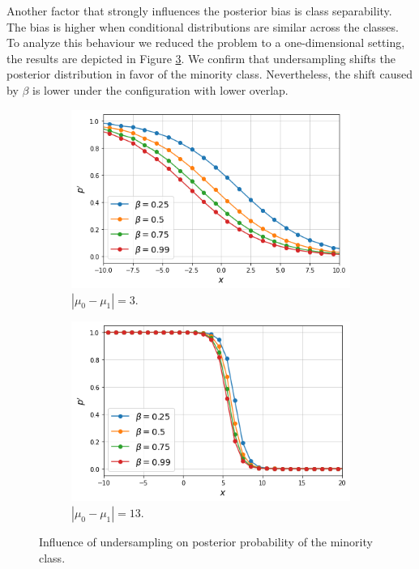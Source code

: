 \documentclass[conference]{IEEEtran}
\begin{document}
		Another factor that strongly influences the posterior bias is class separability. The bias is higher when conditional distributions are similar across the classes\cite{undersampling_posterior}. To analyze this behaviour we reduced the problem to a one-dimensional setting, the results are depicted in Figure \ref{fig:Undersampling_posterior}. We confirm that undersampling shifts the posterior distribution in favor of the minority class. Nevertheless, the shift caused by $\beta$ is lower under the configuration with lower overlap.
			\begin{figure}
			     \centering
			     \begin{subfigure}[b]{0.24\textwidth}
			         \centering
			         \includegraphics[width=\textwidth]{Undersampling_PosteriorBias}
			         \caption{$|\mu_0 - \mu_1|=3$.}
			         \label{fig:Undersampling_PosteriorBias}
			     \end{subfigure}
			     \hfill
			     \begin{subfigure}[b]{0.24\textwidth}
			         \centering
			         \includegraphics[width=\textwidth]{Undersampling_PosteriorBias_Separated}
			         \caption{$|\mu_0 - \mu_1|=13$.}
			         \label{fig:Undersampling_2D_UndersampledDataset}
			     \end{subfigure}
			        \caption{Influence of undersampling on posterior probability of the minority class.}
			        \label{fig:Undersampling_posterior}
			\end{figure}
		
\end{document}
